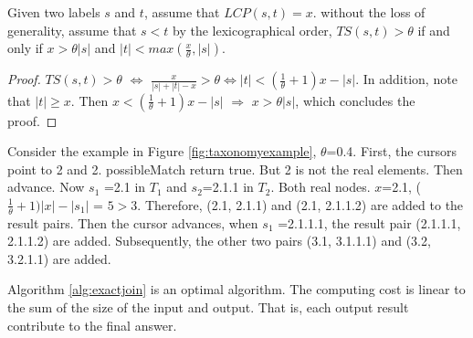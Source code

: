 \begin{lem} Given two labels $s$ and $t$,  assume that $LCP(s,t) = x$. without the loss of generality, assume that $s<t$ by the lexicographical order, $TS(s,t) > \theta$ if and only if  $ x > \theta |s| $ and $  |t| < max(\frac{x}{\theta},|s|)$.
\end{lem}
\begin{proof}  $TS(s,t) > \theta$ $\Leftrightarrow$ $\frac{x}{|s|+|t|-x} > \theta \Leftrightarrow |t| < (\frac{1}{\theta}+1)x-|s|$. In addition, note that $|t| \geq x$. Then $x < (\frac{1}{\theta}+1)x-|s|$ $\Rightarrow$ $x > \theta |s| $, which concludes the proof.
\end{proof}


\smallskip
\smallskip

\begin{example}
Consider the example in Figure \ref{fig:taxonomyexample}, $\theta$=0.4. First, the cursors point to 2 and 2. possibleMatch return true. But 2 is not the real elements.  Then advance. Now $s_1$ =2.1 in $T_1$  and $s_2$=2.1.1 in $T_2$. Both real nodes. $x$=2.1, ($\frac{1}{\theta}+1)|x|-|s_1|$ = $5 > 3$. Therefore, (2.1, 2.1.1) and (2.1, 2.1.1.2) are added to the result pairs. Then the cursor advances, when $s_1$ =2.1.1.1, the result pair (2.1.1.1, 2.1.1.2) are added. Subsequently, the other two pairs (3.1, 3.1.1.1) and (3.2, 3.2.1.1) are added.
\end{example}

\smallskip
\smallskip


\begin{theorem}  Algorithm \ref{alg:exactjoin} is an optimal algorithm. The computing cost is linear to the sum of the size of the input and output. That is, each output result contribute to the final answer.
\end{theorem}




